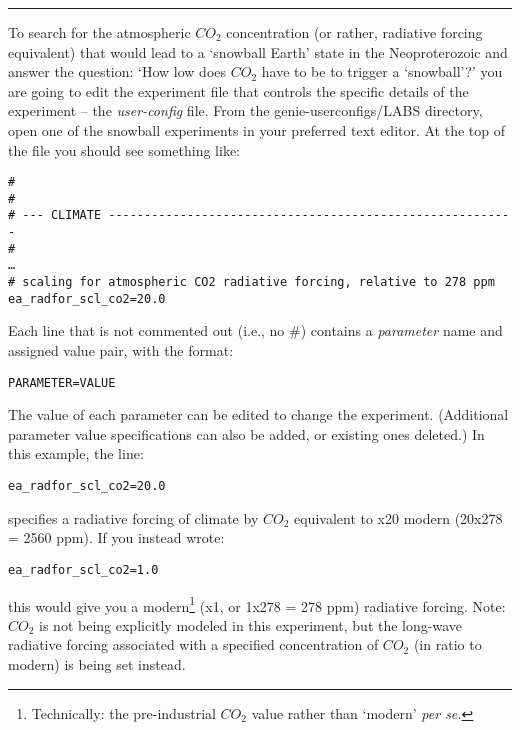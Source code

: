\documentclass[11pt,fleqn]{book} %
\begin{document}
\vspace{1mm}
\noindent\rule{4cm}{0.5pt}
\vspace{2mm}

\noindent To search for the atmospheric \(CO_{2}\) concentration (or rather, radiative forcing equivalent) that would lead to a ‘snowball Earth’ state in the Neoproterozoic and answer the question:
‘How low does \(CO_{2}\) have to be to trigger a ‘snowball’?’
you are going to edit the experiment file that controls the specific details of the experiment -- the \textit{user-config} file. From the \textsf{\footnotesize genie-userconfigs/LABS} directory, open one of the snowball experiments in your preferred  text editor. At the top of the file you should see something like:

\vspace{-2mm}
\small\begin{verbatim}
#
#
# --- CLIMATE ---------------------------------------------------------
#
…
# scaling for atmospheric CO2 radiative forcing, relative to 278 ppm
ea_radfor_scl_co2=20.0
\end{verbatim}\normalsize
\vspace{-2mm}

Each line that is not commented out (i.e., no \#) contains a \textit{parameter} name and assigned value pair, with the format:
\vspace{-2mm}
\begin{verbatim}
PARAMETER=VALUE
\end{verbatim}
\vspace{-2mm}
The value of each parameter can be edited to change the experiment. (Additional parameter value specifications can also be added, or existing ones deleted.) In this example, the line:
\vspace{-2mm}
\begin{verbatim}
ea_radfor_scl_co2=20.0
\end{verbatim}
\vspace{-2mm}
specifies a radiative forcing of climate by \(CO_{2}\) equivalent to x20 modern (20x278 = 2560 ppm). If you instead wrote:
\vspace{-2mm}
\begin{verbatim}
ea_radfor_scl_co2=1.0
\end{verbatim}
\vspace{-2mm}
this would give you a modern\footnote{Technically: the pre-industrial \(CO_{2}\) value rather than ‘modern’ \textit{per se.}} (x1, or 1x278 = 278 ppm) radiative forcing.
Note: \(CO_{2}\) is not being explicitly modeled in this experiment, but the long-wave radiative forcing associated with a specified concentration of \(CO_{2}\) (in ratio to modern) is being set instead.
\end{document}
